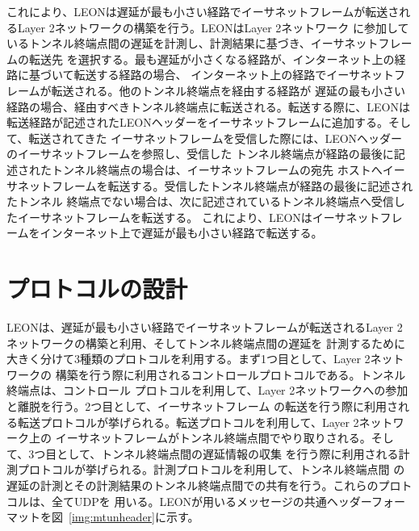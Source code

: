 これにより、LEONは遅延が最も小さい経路でイーサネットフレームが転送されるLayer 2ネットワークの構築を行う。LEONはLayer 2ネットワーク
に参加しているトンネル終端点間の遅延を計測し、計測結果に基づき、イーサネットフレームの転送先
を選択する。最も遅延が小さくなる経路が、インターネット上の経路に基づいて転送する経路の場合、
インターネット上の経路でイーサネットフレームが転送される。他のトンネル終端点を経由する経路が
遅延の最も小さい経路の場合、経由すべきトンネル終端点に転送される。転送する際に、LEONは
転送経路が記述されたLEONヘッダーをイーサネットフレームに追加する。そして、転送されてきた
イーサネットフレームを受信した際には、LEONヘッダーのイーサネットフレームを参照し、受信した
トンネル終端点が経路の最後に記述されたトンネル終端点の場合は、イーサネットフレームの宛先
ホストへイーサネットフレームを転送する。受信したトンネル終端点が経路の最後に記述されたトンネル
終端点でない場合は、次に記述されているトンネル終端点へ受信したイーサネットフレームを転送する。
これにより、LEONはイーサネットフレームをインターネット上で遅延が最も小さい経路で転送する。

\section{プロトコルの設計}
\label{solv:protocol}

LEONは、遅延が最も小さい経路でイーサネットフレームが転送されるLayer 2ネットワークの構築と利用、そしてトンネル終端点間の遅延を
計測するために大きく分けて3種類のプロトコルを利用する。まず1つ目として、Layer 2ネットワークの
構築を行う際に利用されるコントロールプロトコルである。トンネル終端点は、コントロール
プロトコルを利用して、Layer 2ネットワークへの参加と離脱を行う。2つ目として、イーサネットフレーム
の転送を行う際に利用される転送プロトコルが挙げられる。転送プロトコルを利用して、Layer 2ネットワーク上の
イーサネットフレームがトンネル終端点間でやり取りされる。そして、3つ目として、トンネル終端点間の遅延情報の収集
を行う際に利用される計測プロトコルが挙げられる。計測プロトコルを利用して、トンネル終端点間
の遅延の計測とその計測結果のトンネル終端点間での共有を行う。これらのプロトコルは、全てUDPを
用いる。LEONが用いるメッセージの共通ヘッダーフォーマットを図~\ref{img:mtunheader}に示す。

